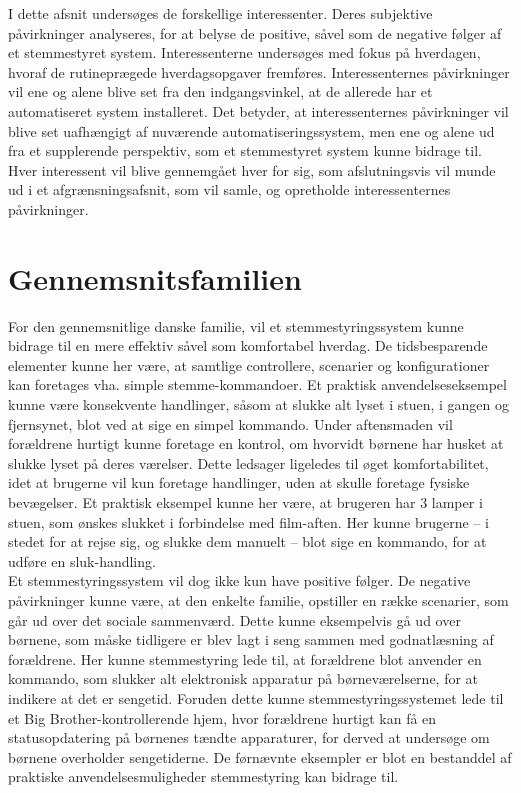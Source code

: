 \label{sec:Interessant}
I dette afsnit undersøges de forskellige interessenter. Deres subjektive påvirkninger analyseres, for at belyse de positive, såvel som de negative følger af et stemmestyret system. Interessenterne undersøges med fokus på hverdagen, hvoraf de rutineprægede hverdagsopgaver fremføres. Interessenternes påvirkninger vil ene og alene blive set fra den indgangsvinkel, at de allerede har et automatiseret system installeret. Det betyder, at interessenternes påvirkninger vil blive set uafhængigt af nuværende automatiseringssystem, men ene og alene ud fra et supplerende perspektiv, som et stemmestyret system kunne bidrage til. \\

Hver interessent vil blive gennemgået hver for sig, som afslutningsvis vil munde ud i et afgrænsningsafsnit, som vil samle, og opretholde interessenternes påvirkninger.

\section{Gennemsnitsfamilien} 
For den gennemsnitlige danske familie, vil et stemmestyringssystem kunne bidrage til en mere effektiv såvel som komfortabel hverdag. De tidsbesparende elementer kunne her være, at samtlige controllere, scenarier og konfigurationer kan foretages vha. simple stemme-kommandoer. Et praktisk anvendelseseksempel kunne være konsekvente handlinger, såsom at slukke alt lyset i stuen, i gangen og fjernsynet, blot ved at sige en simpel kommando. Under aftensmaden vil forældrene hurtigt kunne foretage en kontrol, om hvorvidt børnene har husket at slukke lyset på deres værelser. Dette ledsager ligeledes til øget komfortabilitet, idet at brugerne vil kun foretage handlinger, uden at skulle foretage fysiske bevægelser. Et praktisk eksempel kunne her være, at brugeren har 3 lamper i stuen, som ønskes slukket i forbindelse med film-aften. Her kunne brugerne – i stedet for at rejse sig, og slukke dem manuelt – blot sige en kommando, for at udføre en sluk-handling. \\

Et stemmestyringssystem vil dog ikke kun have positive følger. De negative påvirkninger kunne være, at den enkelte familie, opstiller en række scenarier, som går ud over det sociale sammenværd. Dette kunne eksempelvis gå ud over børnene, som måske tidligere er blev lagt i seng sammen med godnatlæsning af forældrene. Her kunne stemmestyring lede til, at forældrene blot anvender en kommando, som slukker alt elektronisk apparatur på børneværelserne, for at indikere at det er sengetid. Foruden dette kunne stemmestyringssystemet lede til et Big Brother-kontrollerende hjem, hvor forældrene hurtigt kan få en statusopdatering på børnenes tændte apparaturer, for derved at undersøge om børnene overholder sengetiderne.
De førnævnte eksempler er blot en bestanddel af praktiske anvendelsesmuligheder stemmestyring kan bidrage til.

